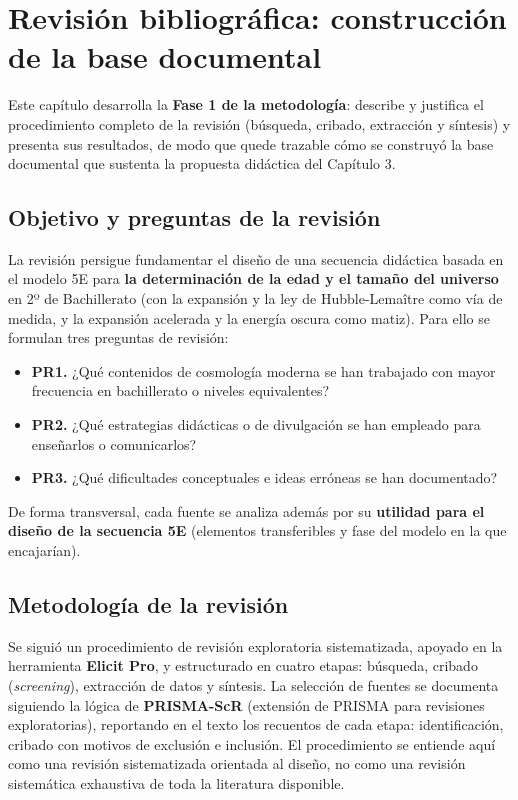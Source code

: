 \chapter{Revisión bibliográfica: construcción de la base documental}\label{cap:revision}

Este capítulo desarrolla la \textbf{Fase 1 de la metodología}: describe y justifica el procedimiento completo de la revisión (búsqueda, cribado, extracción y síntesis) y presenta sus resultados, de modo que quede trazable cómo se construyó la base documental que sustenta la propuesta didáctica del Capítulo 3.

\section{Objetivo y preguntas de la revisión}\label{sec:rev-objetivo}

La revisión persigue fundamentar el diseño de una secuencia didáctica basada en el modelo 5E para \textbf{la determinación de la edad y el tamaño del universo} en 2º de Bachillerato (con la expansión y la ley de Hubble-Lemaître como vía de medida, y la expansión acelerada y la energía oscura como matiz). Para ello se formulan tres preguntas de revisión:

\begin{itemize}
\item \textbf{PR1.} ¿Qué contenidos de cosmología moderna se han trabajado con mayor frecuencia en bachillerato o niveles equivalentes?
\item \textbf{PR2.} ¿Qué estrategias didácticas o de divulgación se han empleado para enseñarlos o comunicarlos?
\item \textbf{PR3.} ¿Qué dificultades conceptuales e ideas erróneas se han documentado?
\end{itemize}

De forma transversal, cada fuente se analiza además por su \textbf{utilidad para el diseño de la secuencia 5E} (elementos transferibles y fase del modelo en la que encajarían).

\section{Metodología de la revisión}\label{sec:rev-metodologia}

Se siguió un procedimiento de revisión exploratoria sistematizada, apoyado en la herramienta \textbf{Elicit Pro}, y estructurado en cuatro etapas: búsqueda, cribado (\textit{screening}), extracción de datos y síntesis. La selección de fuentes se documenta siguiendo la lógica de \textbf{PRISMA-ScR} (extensión de PRISMA para revisiones exploratorias), reportando en el texto los recuentos de cada etapa: identificación, cribado con motivos de exclusión e inclusión. El procedimiento se entiende aquí como una revisión sistematizada orientada al diseño, no como una revisión sistemática exhaustiva de toda la literatura disponible.


